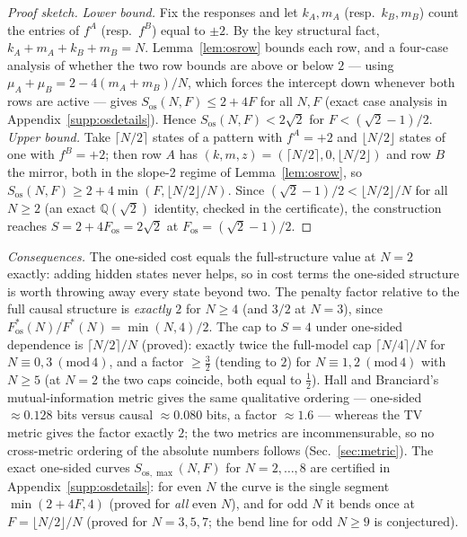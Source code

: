 \documentclass[aps,pra,reprint,superscriptaddress,floatfix]{revtex4-2}
\begin{document}
\begin{proof}[Proof sketch]
\emph{Lower bound.} Fix the responses and let $k_A,m_A$ (resp.\ $k_B,m_B$)
count the entries of $f^A$ (resp.\ $f^B$) equal to $\pm2$. By the key
structural fact, $k_A+m_A+k_B+m_B=N$. Lemma~\ref{lem:osrow} bounds each row,
and a four-case analysis of whether the two row bounds are above or below
$2$ --- using $\mu_A+\mu_B=2-4(m_A+m_B)/N$, which forces the intercept down
whenever both rows are active --- gives
$S_{\mathrm{os}}(N,F)\le 2+4F$ for all $N,F$ (exact case analysis in Appendix~\ref{supp:osdetails}). Hence $S_{\mathrm{os}}(N,F)<2\sqrt2$ for
$F<(\sqrt2-1)/2$.
\emph{Upper bound.} Take $\lceil N/2\rceil$ states of a pattern with
$f^A=+2$ and $\lfloor N/2\rfloor$ states of one with $f^B=+2$; then row $A$
has $(k,m,z)=(\lceil N/2\rceil,0,\lfloor N/2\rfloor)$ and row $B$ the
mirror, both in the slope-2 regime of Lemma~\ref{lem:osrow}, so
$S_{\mathrm{os}}(N,F)\ge 2+4\min(F,\lfloor N/2\rfloor/N)$. Since
$(\sqrt2-1)/2<\lfloor N/2\rfloor/N$ for all $N\ge2$ (an exact
$\mathbb{Q}(\sqrt2)$ identity, checked in the certificate), the
construction reaches $S=2+4F_{\mathrm{os}}=2\sqrt2$ at
$F_{\mathrm{os}}=(\sqrt2-1)/2$.
\end{proof}

\noindent
\emph{Consequences.} The one-sided cost equals the full-structure value at
$N=2$ exactly: adding hidden states never helps, so in cost terms the
one-sided structure is worth throwing away every state beyond two. The
penalty factor relative to the full causal structure is \emph{exactly
$2$} for $N\ge4$ (and $3/2$ at $N=3$), since
$F^*_{\mathrm{os}}(N)/F^*(N)=\min(N,4)/2$. The cap to $S=4$ under
one-sided dependence is $\lceil N/2\rceil/N$ (proved): exactly twice the
full-model cap $\lceil N/4\rceil/N$ for $N\equiv 0,3\ (\mathrm{mod}\,4)$,
and a factor $\ge\tfrac32$ (tending to $2$) for $N\equiv 1,2\
(\mathrm{mod}\,4)$ with $N\ge5$ (at $N=2$ the two caps coincide, both
equal to $\tfrac12$). Hall and Branciard's mutual-information metric gives
the same qualitative ordering --- one-sided $\approx0.128$ bits versus
causal $\approx0.080$ bits, a factor $\approx1.6$ --- whereas the TV metric
gives the factor exactly $2$; the two metrics are incommensurable, so no
cross-metric ordering of the absolute numbers follows (Sec.~\ref{sec:metric}).
The exact one-sided curves $S_{\mathrm{os},\max}(N,F)$ for
$N=2,\dots,8$ are certified in Appendix~\ref{supp:osdetails}: for even $N$ the
curve is the single segment $\min(2+4F,4)$ (proved for \emph{all} even
$N$), and for odd $N$ it bends once at $F=\lfloor N/2\rfloor/N$ (proved for
$N=3,5,7$; the bend line for odd $N\ge9$ is conjectured).
\end{document}
